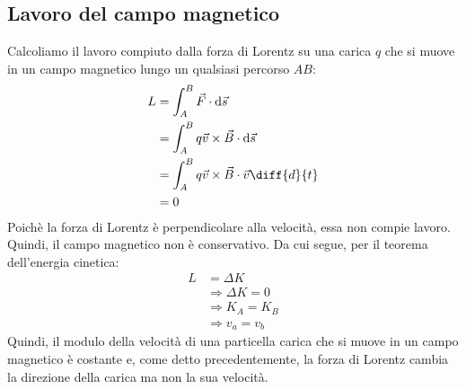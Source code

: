 \documentclass[12pt]{report}
\begin{document}
\subsection{Lavoro del campo magnetico} Calcoliamo il lavoro compiuto dalla forza di Lorentz su una carica $q$ che si muove in un campo magnetico lungo un qualsiasi percorso $AB$:
\begin{align*}
	L &= \displaystyle\int_{A}^{B}\vec{F} \cdot \dd\vec{s} \\
	&= \displaystyle\int_{A}^{B}q\vec{v} \times \vec{B} \cdot \dd\vec{s} \\
	&= \displaystyle\int_{A}^{B}q\vec{v} \times \vec{B} \cdot \vec{v}\diff{d}{t} \\
	&= 0
\end{align*}
Poichè la forza di Lorentz è perpendicolare alla velocità, essa non compie lavoro. Quindi, il campo magnetico non è conservativo. Da cui segue, per il teorema dell'energia cinetica:
\begin{align*}
	L &= \Delta K \\
	&\Rightarrow \Delta K = 0 \\
	&\Rightarrow K_A = K_B \\
	&\Rightarrow v_a = v_b
\end{align*}
Quindi, il modulo della velocità di una particella carica che si muove in un campo magnetico è costante e, come detto precedentemente, la forza di Lorentz cambia la direzione della carica ma non la sua velocità.
\end{document}
